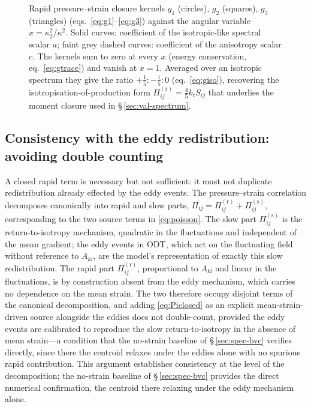 \documentclass[11pt,a4paper]{article}
\begin{document}
\begin{figure}
  \centering
  \caption{Rapid pressure--strain closure kernels $g_1$ (circles), $g_2$
  (squares), $g_3$ (triangles) (eqs.~\eqref{eq:g1}--\eqref{eq:g3}) against
  the angular variable $x=\kappa_2^2/\kappa^2$. Solid curves: coefficient
  of the isotropic-like spectral scalar $a$; faint grey dashed curves:
  coefficient of the anisotropy scalar $c$. The kernels sum to zero at every $x$ (energy conservation,
  eq.~\eqref{eq:gtrace}) and vanish at $x=1$. Averaged over an isotropic
  spectrum they give the ratio $+\tfrac15:-\tfrac15:0$
  (eq.~\eqref{eq:giso}), recovering the isotropisation-of-production form
  $\Pi^{(\mathrm r)}_{ij}=\tfrac45 k_t S_{ij}$ \citep{Crow1968} that underlies
  the moment closure used in \S\,\ref{sec:val-spectrum}.}
  \label{fig:pi-kernels}
\end{figure}

\subsection{Consistency with the eddy redistribution: avoiding double
counting}\label{sec:doublecount}

A closed rapid term is necessary but not sufficient: it must not duplicate
redistribution already effected by the eddy events. The pressure--strain
correlation decomposes canonically into rapid and slow parts,
$\Pi_{ij}=\Pi^{(\mathrm r)}_{ij}+\Pi^{(\mathrm s)}_{ij}$, corresponding to the two source terms in \eqref{eq:poisson}. The slow part
$\Pi^{(\mathrm s)}_{ij}$ is the return-to-isotropy mechanism, quadratic in the
fluctuations and independent of the mean gradient; the eddy events in ODT,
which act on the fluctuating field without reference to $A_{kl}$, are the
model's representation of exactly this slow redistribution. The rapid part
$\Pi^{(\mathrm r)}_{ij}$, proportional to $A_{kl}$ and linear in the
fluctuations, is by construction absent from the eddy mechanism, which carries
no dependence on the mean strain. The two therefore occupy disjoint terms of
the canonical decomposition, and adding \eqref{eq:Piclosed} as an explicit
mean-strain-driven source alongside the eddies does not double-count, provided
the eddy events are calibrated to reproduce the slow return-to-isotropy in the
absence of mean strain---a condition that the no-strain baseline of
\S\,\ref{sec:spec-bvc} verifies directly, since there the centroid relaxes
under the eddies alone with no spurious rapid contribution. This argument establishes consistency at the level of the decomposition; the no-strain baseline of \S\,\ref{sec:spec-bvc} provides the direct numerical confirmation, the centroid there relaxing under the eddy mechanism alone.
\end{document}

